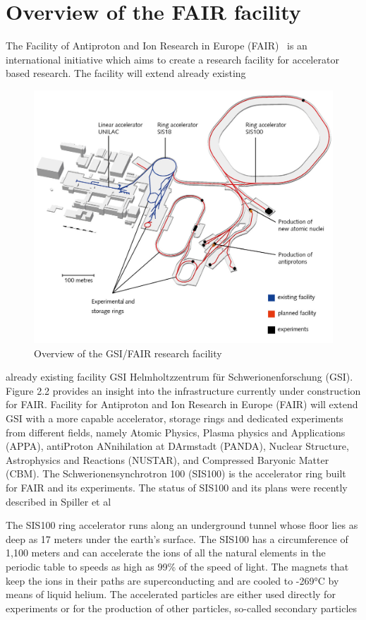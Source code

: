 
\section{Overview of the FAIR facility}
The Facility of Antiproton and Ion Research in Europe (\gls{FAIR})~\cite{Spiller_2020} is an international initiative which aims to create a research facility for accelerator based research. The facility will extend already existing 
\begin{figure}[!h]
    \centering
    \includegraphics[width=0.65\columnwidth]{Chapter2/images/fair.jpg}
    \caption{Overview of the GSI/FAIR research facility~\cite{fair}}
    \label{fig:fair}
\end{figure}

already existing facility GSI Helmholtzzentrum
für Schwerionenforschung (GSI). Figure 2.2 provides an insight into the infrastructure
currently under construction for FAIR. Facility for Antiproton and Ion
Research in Europe (FAIR) will extend GSI with a more capable accelerator, storage
rings and dedicated experiments from different fields, namely Atomic Physics,
Plasma physics and Applications (APPA), antiProton ANnihilation at DArmstadt
(PANDA), Nuclear Structure, Astrophysics and Reactions (NUSTAR), and Compressed
Baryonic Matter (CBM). The Schwerionensynchrotron 100 (SIS100) is
the accelerator ring built for FAIR and its experiments. The status of SIS100 and
its plans were recently described in Spiller et al

The SIS100 ring accelerator runs along an underground tunnel whose floor lies as deep as 17 meters under the earth’s surface. The SIS100 has a circumference of 1,100 meters and can accelerate the ions of all the natural elements in the periodic table to speeds as high as 99\% of the speed of light. The magnets that keep the ions in their paths are superconducting and are cooled to -269°C by means of liquid helium. The accelerated particles are either used directly for experiments or for the production of other particles, so-called secondary particles
